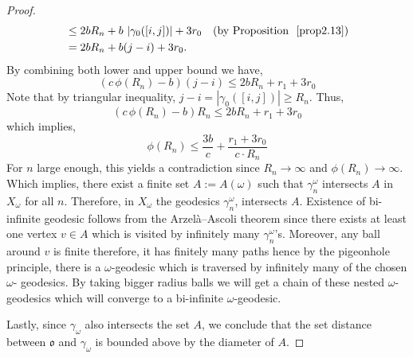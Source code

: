 \documentclass[12 pt]{amsart}
\newcommand{\gothic}{\mathfrak}
\newcommand{\go}{{\gothic o}}
\theoremstyle{definition}
\theoremstyle{remark}
\begin{document}
\begin{proof}
\[\begin{aligned}
& \leq 2bR_{n} + b\,\left|\gamma_{0}([i, j])\right| + 3r_{0} \quad \text{(by Proposition ~\ref{prop2.13})} \\
& = 2bR_{n} + b(j - i) + 3r_{0}.
\end{aligned}
\]
By combining both lower and upper bound we have,
\[(c\, \phi\left(R_{n}\right)-b)(j-i)\leq 2bR_{n} + r_{1}+ 3r_{0}\]
Note that by triangular inequality, $j-i=\left|\gamma_{0}([i, j])\right| \geq R_{n}$. Thus,
\[(c\, \phi\left(R_{n}\right)-b)R_n\leq 2bR_{n} + r_{1}+ 3r_{0}\]
which implies, 
\begin{equation}
\phi(R_{n})\leq \frac{3b}{c} +\frac{r_{1}+ 3r_{0}}{c \cdot R_n}
\end{equation}
For $n$ large enough, this yields a contradiction since $R_n\rightarrow \infty$ and $\phi(R_n)\rightarrow \infty.$
Which implies, there exist a finite set $A:=A(\omega)$ such that $\gamma_n^\omega$ intersects $A$ in $X_\omega$ for all $n$. Therefore, in $X_\omega$ the geodesics $\gamma_n^\omega$, intersects $A$.
\newline
 Existence of bi-infinite geodesic follows from the Arzelà–Ascoli theorem since there exists at least one vertex $v\in A$ which is visited by infinitely many $\gamma_n^\omega$'s. Moreover, any ball around $v$ is finite therefore, it has finitely many paths hence by the pigeonhole principle, there is a $\omega$-geodesic which is traversed by infinitely many of the chosen $\omega$- geodesics. By taking bigger radius balls we will get a chain of these nested $\omega$-geodesics which will converge to a bi-infinite $\omega$-geodesic.

 Lastly, since $\gamma_\omega$ also intersects the set $A$, we conclude that the set distance between $\go$ and
 $\gamma_\omega$ is bounded above by the diameter of $A$.
\end{proof}
\end{document}
